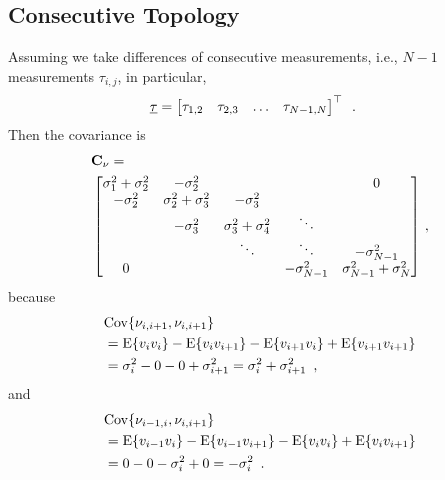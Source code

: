 \documentclass[conference]{IEEEtran}
\begin{document}
\subsection{Consecutive Topology}
Assuming we take differences of consecutive measurements, i.e., $N-1$ measurements $\tau_{i,j}$, in particular, 
\begin{align}
    \underline{\tau}&=\begin{bmatrix}\tau_{1,2}& \tau_{2,3}& \hdots& \tau_{N-1,N}\end{bmatrix}^\top \enspace. 
\end{align}
Then the covariance is 
\begin{align}
    &{\mathbf C}_\nu = \\
    &\begin{bmatrix}
        \sigma_1^2+\sigma_2^2 & -\sigma_2^2 & & & 0 \\ 
        -\sigma_2^2 & \sigma_2^2+\sigma_3^2 & -\sigma_3^2  \\
         & -\sigma_3^2 & \sigma_3^2 + \sigma_4^2 & \ddots \\
         & & \ddots & \ddots & -\sigma_{N-1}^2 \\ 
         0& & & -\sigma_{N-1}^2 & \sigma_{N-1}^2+\sigma_N^2
    \end{bmatrix} \,,
\end{align}
because 
\begin{align}
    &\Cov{\nu_{i,i+1}, \nu_{i,i+1}} \\
    &= \E{v_i v_i} - \E{v_i v_{i+1}} - \E{v_{i+1} v_i} + \E{v_{i+1} v_{i+1}} \\
    &= \sigma_i^2 - 0 - 0 + \sigma_{i+1}^2 
    = \sigma_i^2 + \sigma_{i+1}^2 \enspace, 
\end{align} 
and
\begin{align} 
    &\Cov{\nu_{i-1,i}, \nu_{i,i+1}} \\ 
    &= \E{v_{i-1} v_i} - \E{v_{i-1} v_{i+1}} - \E{v_i v_i} + \E{v_i v_{i+1}} \\
    &= 0 - 0 - \sigma_i^2 + 0 
    = -\sigma_i^2 \enspace. 
\end{align}

%
%
\end{document}
